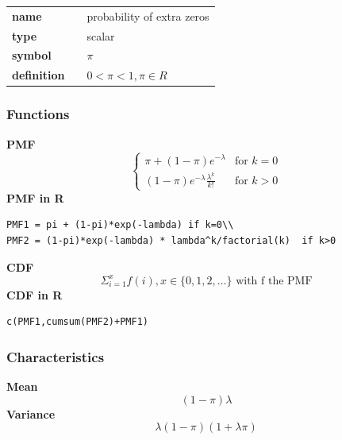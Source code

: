 \noindent\begin{tabular}{p{2cm}cl}
\textbf{name} & & probability of extra zeros \\
\textbf{type} & & scalar \\
\textbf{symbol} & & $\pi$  \\
\textbf{definition} & & $0<\pi<1, \pi \in  R$
\end{tabular}
\subsubsection*{Functions}

\smallskip \noindent \hspace{.2cm} \textbf{PMF} 
\begin{equation*}\begin{cases}
\pi + (1-\pi) e^{-\lambda}& \text{for } k = 0 \\ 
(1-\pi) e^{-\lambda} \frac{\lambda^k}{k!} & \text{for } k > 0
\end{cases}\end{equation*}
\smallskip \noindent \hspace{.2cm} \textbf{PMF in R}  
\begin{verbatim}
PMF1 = pi + (1-pi)*exp(-lambda) if k=0\\
PMF2 = (1-pi)*exp(-lambda) * lambda^k/factorial(k)  if k>0\end{verbatim}
\smallskip \noindent \hspace{.2cm} \textbf{CDF} 
\begin{equation*}\Sigma_{i=1}^x f(i), x \in \{0,1,2,...\}
\text { with f the PMF}\end{equation*}
\smallskip \noindent \hspace{.2cm} \textbf{CDF in R}  
\begin{verbatim}
c(PMF1,cumsum(PMF2)+PMF1)
\end{verbatim}
\smallskip
\subsubsection*{Characteristics}
\smallskip \noindent \hspace{.2cm} \textbf{Mean} 
\begin{equation*}(1-\pi) \lambda\end{equation*}
\smallskip \noindent \hspace{.2cm} \textbf{Variance} 
\begin{equation*}\lambda (1-\pi) (1 + \lambda \pi)\end{equation*}
\smallskip


%



